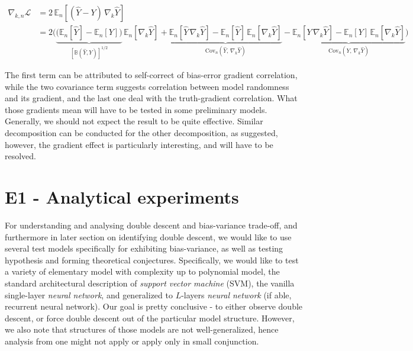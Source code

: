 \documentclass[10pt]{article}
\begin{document}
\begin{align}
    \nabla_{k,n}\mathcal{L}
    &= 2\,\mathbb{E}_n\!\left[(\hat Y - Y)\,\nabla_k \hat Y\right] \\
    &= 2\Bigg(
    \underset{\left[\mathbb{B}(\hat{Y},Y)\right]^{1/2}}{\underbrace{\bigl(\mathbb{E}_n[\hat Y] - \mathbb{E}_n[Y]\bigr)}}\,\mathbb{E}_n[\nabla_k \hat Y]
    + \underset{\mathrm{Cov}_n(\hat Y,\,\nabla_k \hat Y)}{\underbrace{\mathbb{E}_n[\hat Y\,\nabla_k \hat Y] - \mathbb{E}_n[\hat Y]\,\mathbb{E}_n[\nabla_k \hat Y]}}
    - \underset{\mathrm{Cov}_n(Y,\,\nabla_k \hat Y)}{\underbrace{\mathbb{E}_n[Y\,\nabla_k \hat Y] - \mathbb{E}_n[Y]\,\mathbb{E}_n[\nabla_k \hat Y]}}
    \Bigg)
\end{align}

The first term can be attributed to self-correct of bias-error gradient correlation, while the two covariance term suggests correlation between model randomness and its gradient, and the last one deal with the truth-gradient correlation. What those gradients mean will have to be tested in some preliminary models. Generally, we should not expect the result to be quite effective. Similar decomposition can be conducted for the other decomposition, as suggested, however, the gradient effect is particularly interesting, and will have to be resolved. 

\clearpage

\section{E1 - Analytical experiments}

For understanding and analysing double descent and bias-variance trade-off, and furthermore in later section on identifying double descent, we would like to use several test models specifically for exhibiting bias-variance, as well as testing hypothesis and forming theoretical conjectures. Specifically, we would like to test a variety of elementary model with complexity up to polynomial model, the standard architectural description of \textit{support vector machine} (SVM), the vanilla single-layer \textit{neural network}, and generalized to $L$-layers \textit{neural network} (if able, recurrent neural network). Our goal is pretty conclusive - to either observe double descent, or force double descent out of the particular model structure. However, we also note that structures of those models are not well-generalized, hence analysis from one might not apply or apply only in small conjunction. 
\end{document}
